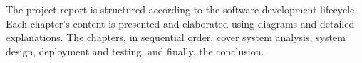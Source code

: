 The project report is structured according to the software development lifecycle. Each chapter's content is presented and elaborated using diagrams and detailed explanations. The chapters, in sequential order, cover system analysis, system design, deployment and testing, and finally, the conclusion.
\cleardoublepage



